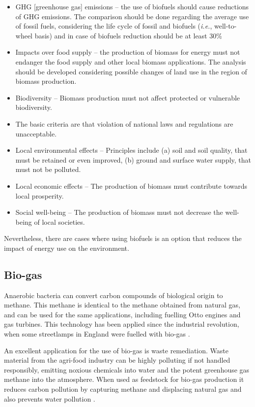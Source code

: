 {\itshape
\begin{itemize}
  \item GHG [greenhouse gas] emissions – the use of biofuels should cause reductions of GHG emissions. The
comparison should be done regarding the average use of fossil fuels, considering the life
cycle of fossil and biofuels (\textit{i.e.}, well-to-wheel basis) and in case of biofuels reduction
should be at least 30\%
 \item Impacts over food supply – the production of biomass for energy must not endanger the
food supply and other local biomass applications. The analysis should be developed
considering possible changes of land use in the region of biomass production.
 \item Biodiversity – Biomass production must not affect protected or vulnerable biodiversity.
 \item The basic criteria are that violation of national laws and regulations are unacceptable.
 \item Local environmental effects – Principles include (a) soil and soil quality, that must be
retained or even improved, (b) ground and surface water supply, that must not be polluted.
 \item Local economic effects – The production of biomass must contribute towards local
prosperity.
 \item  Social well-being – The production of biomass must not decrease the well-being of local societies. 
\end{itemize}
}

Nevertheless, there are cases where using biofuels is an option that reduces the
impact of energy use on the environment.

\subsection{Bio-gas}

Anaerobic bacteria can convert carbon compounds of biological origin to methane.
This methane is identical to the methane obtained from natural gas, and can be
used for the same applications, including fuelling Otto engines and gas
turbines. This technology has been applied since the industrial revolution, when
some streetlamps in England were fuelled with bio-gas \autocite[p. 448]{Klass1998}.

An excellent application for the use of bio-gas is waste remediation. Waste
material from the agri-food industry can be highly polluting if not handled
responsibly, emitting noxious chemicals into water and the potent greenhouse gas
methane into the atmosphere. When used as feedstock for bio-gas production it
reduces carbon pollution by capturing methane and displacing natural gas and
also prevents water pollution \autocite{Venter2014}.

